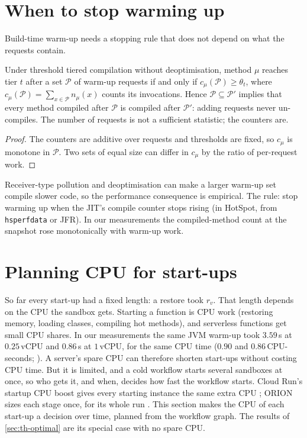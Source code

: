 \section{When to stop warming up}
\label{sec:th-depthwork}

Build-time warm-up needs a stopping rule that does not depend on what the requests contain.

\begin{proposition}
\label{prop:depth}
Under threshold tiered compilation without deoptimisation, method $\mu$ reaches tier $t$ after
a set $\mathcal{P}$ of warm-up requests if and only if $c_\mu(\mathcal{P}) \ge \theta_t$, where
$c_\mu(\mathcal{P}) = \sum_{x \in \mathcal{P}} n_\mu(x)$ counts its invocations. Hence
$\mathcal{P} \subseteq \mathcal{P}'$ implies that every method compiled after $\mathcal{P}$ is
compiled after $\mathcal{P}'$: adding requests never un-compiles. The number of requests is not
a sufficient statistic; the counters are.
\end{proposition}

\begin{proof}
The counters are additive over requests and thresholds are fixed, so $c_\mu$ is monotone in
$\mathcal{P}$. Two sets of equal size can differ in $c_\mu$ by the ratio of per-request work.
\end{proof}

Receiver-type pollution and deoptimisation can make a larger warm-up set compile slower code,
so the performance consequence is empirical. The rule: stop warming up when the JIT's
compile counter stops rising (in HotSpot, from \texttt{hsperfdata} or JFR). In our measurements
the compiled-method count at the snapshot rose monotonically with warm-up work.

\section{Planning CPU for start-ups}
\label{sec:th-cpu}

So far every start-up had a fixed length: a restore took $r_v$. That length depends on the CPU
the sandbox gets. Starting a function is CPU work (restoring memory, loading classes, compiling
hot methods), and serverless functions get small CPU shares. In our measurements the same JVM
warm-up took $3.59$\,s at $0.25$\,vCPU and $0.86$\,s at $1$\,vCPU, for the same CPU time ($0.90$
and $0.86$\,CPU-seconds; ). A server's spare CPU can therefore
shorten start-ups without costing CPU time. But it is limited, and a cold workflow starts several
sandboxes at once, so who gets it, and when, decides how fast the workflow starts. Cloud Run's
startup CPU boost gives every starting instance the same extra CPU \cite{cloudrunboost}; ORION
sizes each stage once, for its whole run \cite{orion2022}. This section makes the CPU of each
start-up a decision over time, planned from the workflow graph. The results of
\cref{sec:th-optimal} are its special case with no spare CPU.

